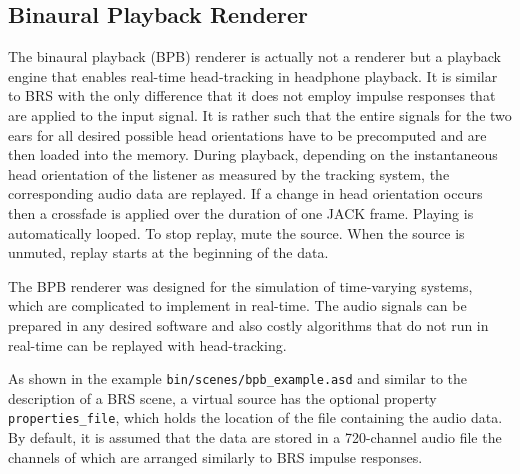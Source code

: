 \subsection{Binaural Playback Renderer}

The binaural playback (BPB) renderer is actually not a renderer but
a playback engine that enables real-time head-tracking in headphone
playback. It is similar to BRS with the only difference that it does
not employ impulse responses that are applied to the input signal.
It is rather such that the entire signals for the two ears for all
desired possible head orientations have to be precomputed and are then
loaded into the memory. During playback, depending on the
instantaneous head orientation of the listener as measured by the
tracking system, the corresponding audio data are replayed. If a
change in head orientation occurs then a crossfade is applied over
the duration of one JACK frame. Playing is automatically looped. To
stop replay, mute the source. When the source is unmuted, replay
starts at the beginning of the data.

The BPB renderer was designed for the simulation of time-varying
systems, which are complicated to implement in real-time. The
audio signals can be prepared in any desired software and also
costly algorithms that do not run in real-time can be replayed with
head-tracking.

As shown in the example \texttt{bin/scenes/bpb\_example.asd} and
similar to the description of a BRS scene, a virtual source has the
optional property \texttt{properties\_file}, which holds the location
of the file containing the audio data. By default, it is assumed
that the data are stored in a 720-channel audio file the channels of
which are arranged similarly to BRS impulse responses.

